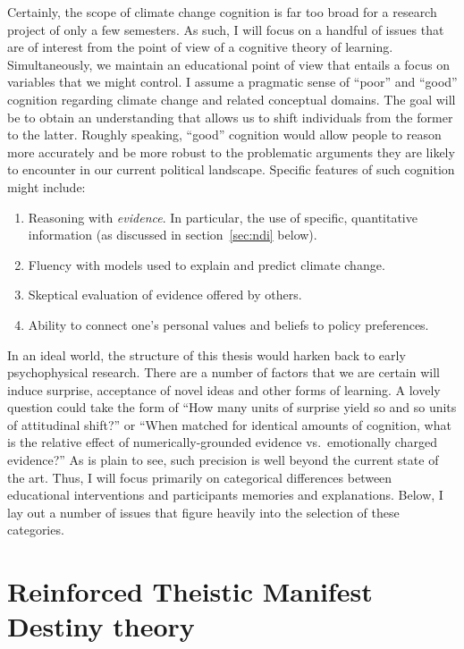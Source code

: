 Certainly, the scope of climate change cognition is far too broad for a research
project of only a few semesters. As such, I will focus on a handful of issues
that are of interest from the point of view of a cognitive theory of learning.
Simultaneously, we maintain an educational point of view that entails a focus on
variables that we might control. I assume a pragmatic sense of ``poor'' and
``good'' cognition regarding climate change and related conceptual domains. The
goal will be to obtain an understanding that allows us to shift individuals from
the former to the latter. Roughly speaking, ``good'' cognition would allow
people to reason more accurately and be more robust to the problematic
arguments they are likely to encounter in our current political landscape.
Specific features of such cognition might include:

\begin{enumerate}
\item Reasoning with \emph{evidence}. In particular, the use of specific,
quantitative information (as discussed in section~\ref{sec:ndi} below).
\item Fluency with models used to explain and predict climate change.
\item Skeptical evaluation of evidence offered by others.
\item Ability to connect one's personal values and beliefs to policy
preferences.
\end{enumerate}

In an ideal world, the structure of this thesis would harken back to early
psychophysical research. There are a number of factors that we are certain will
induce surprise, acceptance of novel ideas and other forms of learning. A
lovely question could take the form of ``How many units of surprise yield so and
so units of attitudinal shift?'' or ``When matched for identical amounts of
cognition, what is the relative effect of numerically-grounded evidence vs.\
emotionally charged evidence?'' As is plain to see, such precision is well
beyond the current state of the art. Thus, I will focus primarily on categorical
differences between educational interventions and participants memories and
explanations. Below, I lay out a number of issues that figure heavily into the
selection of these categories.

\section{Reinforced Theistic Manifest Destiny theory}

